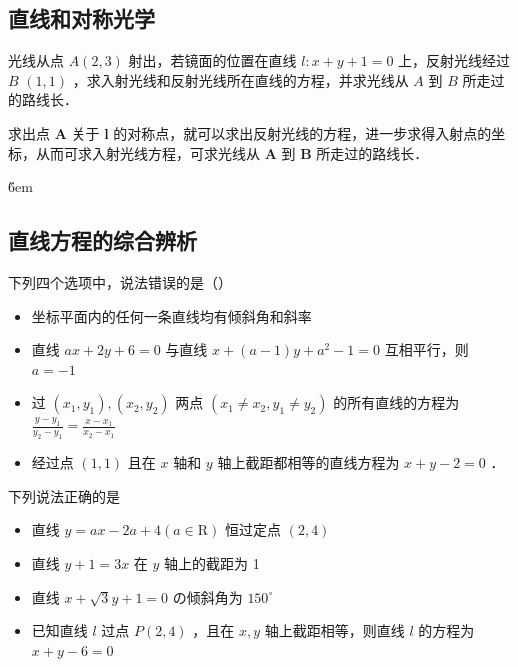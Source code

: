 \subsection{直线和对称光学}

\begin{example}
    光线从点 $A(2,3)$ 射出，若镜面的位置在直线 $l: x+y+1=0$ 上，反射光线经过 $B$ $(1,1)$ ，求入射光线和反射光线所在直线的方程，并求光线从 $A$ 到 $B$ 所走过的路线长．
\end{example}

\begin{tips}
    求出点 $\boldsymbol{A}$ 关于 $\boldsymbol{l}$ 的对称点，就可以求出反射光线的方程，进一步求得入射点的坐标，从而可求入射光线方程，可求光线从 $\boldsymbol{A}$ 到 $\boldsymbol{B}$ 所走过的路线长．
\end{tips}

\v{6em}

\subsection{直线方程的综合辨析}

\begin{example}
    下列四个选项中，说法错误的是（\hspace{2em}）
    \begin{itemize}
        \item  坐标平面内的任何一条直线均有倾斜角和斜率
        \item  直线 $a x+2 y+6=0$ 与直线 $x+(a-1) y+a^2-1=0$ 互相平行，则 $a=-1$
        \item  过 $\left(x_1, y_1\right),\left(x_2, y_2\right)$ 两点 $\left(x_1 \neq x_2, y_1 \neq y_2\right)$ 的所有直线的方程为 $\frac{y-y_1}{y_2-y_1}=\frac{x-x_1}{x_2-x_1}$
        \item  经过点 $(1,1)$ 且在 $x$ 轴和 $y$ 轴上截距都相等的直线方程为 $x+y-2=0$ ．
    \end{itemize}
\end{example}

\vspace{4em}

\begin{example}
    下列说法正确的是
    \begin{itemize}
        \item[（1）] 直线 $y=a x-2 a+4(a \in \mathrm{R})$ 恒过定点 $(2,4)$
        \item[（2）] 直线 $y+1=3 x$ 在 $y$ 轴上的截距为 1
        \item[（3）] 直线 $x+\sqrt{3} y+1=0$ の倾斜角为 $150^{\circ}$
        \item[（4）] 已知直线 $l$ 过点 $P(2,4)$ ，且在 $x, y$ 轴上截距相等，则直线 $l$ 的方程为 $x+y-6=0$
    \end{itemize}
\end{example}

\vspace{4em}
